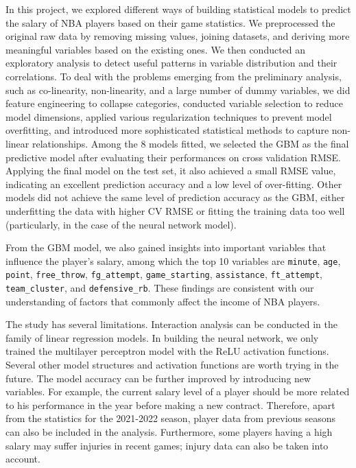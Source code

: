 \documentclass[
]{article}
\begin{document}
In this project, we explored different ways of building statistical
models to predict the salary of NBA players based on their game
statistics. We preprocessed the original raw data by removing missing
values, joining datasets, and deriving more meaningful variables based
on the existing ones. We then conducted an exploratory analysis to
detect useful patterns in variable distribution and their correlations.
To deal with the problems emerging from the preliminary analysis, such
as co-linearity, non-linearity, and a large number of dummy variables,
we did feature engineering to collapse categories, conducted variable
selection to reduce model dimensions, applied various regularization
techniques to prevent model overfitting, and introduced more
sophisticated statistical methods to capture non-linear relationships.
Among the 8 models fitted, we selected the GBM as the final predictive
model after evaluating their performances on cross validation RMSE.
Applying the final model on the test set, it also achieved a small RMSE
value, indicating an excellent prediction accuracy and a low level of
over-fitting. Other models did not achieve the same level of prediction
accuracy as the GBM, either underfitting the data with higher CV RMSE or
fitting the training data too well (particularly, in the case of the
neural network model).

From the GBM model, we also gained insights into important variables
that influence the player's salary, among which the top 10 variables are
\texttt{minute}, \texttt{age}, \texttt{point}, \texttt{free\_throw},
\texttt{fg\_attempt}, \texttt{game\_starting}, \texttt{assistance},
\texttt{ft\_attempt}, \texttt{team\_cluster}, and
\texttt{defensive\_rb}. These findings are consistent with our
understanding of factors that commonly affect the income of NBA players.

The study has several limitations. Interaction analysis can be conducted
in the family of linear regression models. In building the neural
network, we only trained the multilayer perceptron model with the ReLU
activation functions. Several other model structures and activation
functions are worth trying in the future. The model accuracy can be
further improved by introducing new variables. For example, the current
salary level of a player should be more related to his performance in
the year before making a new contract. Therefore, apart from the
statistics for the 2021-2022 season, player data from previous seasons
can also be included in the analysis. Furthermore, some players having a
high salary may suffer injuries in recent games; injury data can also be
taken into account.
\end{document}
